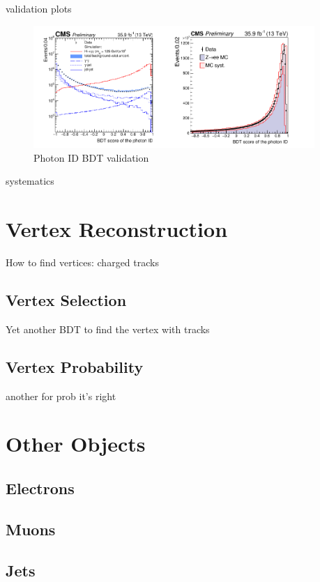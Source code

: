 validation plots
\begin{figure}[h!]
    \includegraphics[width=0.95\textwidth]{figures/object_reco/CMS-PAS-HIG-16-040_Figure_002.pdf}
    \caption{Photon ID BDT validation}
        \label{fig:object_reco:photon_id_bdt}
\end{figure}


systematics

\section{Vertex Reconstruction}
How to find vertices: charged tracks

\subsection{Vertex Selection}
Yet another BDT to find the vertex with tracks

\subsection{Vertex Probability}
another for prob it's right


\section{Other Objects}

\subsection{Electrons}

\subsection{Muons}

\subsection{Jets}
